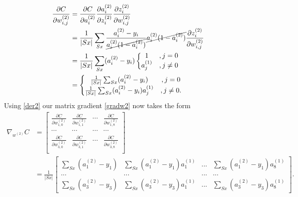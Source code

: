 \documentclass[a4paper,12pt,notitlepage]{article}
\begin{document}
\begin{equation} \label{der2}
\begin{split}
\frac{\partial C}{\partial w_{i,j}^{(2)}}&=\frac{\partial C}{\partial a_{i}^{(2)}}\frac{\partial a_{i}^{(2)}}{\partial z_{i}^{(2)}}\frac{\partial z_{i}^{(2)}}{\partial w_{i,j}^{(2)}}\\
&=\frac{1}{|Sx|}\sum_{Sx}\frac{a_{i}^{(2)}-y_{i}}{\cancel{a_{i}^{(2)}(1-a_{i}^{(2)})}}\cancel{a_{i}^{(2)}(1-a_{i}^{(2)})}\frac{\partial z_{i}^{(2)}}{\partial w_{i,j}^{(2)}}\\
&=\frac{1}{|Sx|}\sum_{Sx}(a_{i}^{(2)}-y_{i})\left\{\begin{matrix} 1&, j=0\\ a_{j}^{(1)}&, j\neq 0 \end{matrix}\right.\\
&=\left\{\begin{matrix} \frac{1}{|Sx|}\sum_{Sx}(a_{i}^{(2)}-y_{i})&, j=0\\ \frac{1}{|Sx|}\sum_{Sx}(a_{i}^{(2)}-y_{i})a_{j}^{(1)}&, j\neq 0. \end{matrix}\right.
\end{split}
\end{equation}
Using \eqref{der2} our matrix gradient \eqref{gradw2} now takes the form
\begin{equation} \label{gradw2f}
\begin{split}
\nabla_{w^{(2)}}C&=\begin{bmatrix}
 \frac{\partial C}{\partial w_{1,0}^{(2)}}& \frac{\partial C}{\partial w_{1,1}^{(2)}} &\cdots &\frac{\partial C}{\partial w_{1,8}^{(2)}}\\ 
 \cdots&\cdots&\cdots&\cdots \\
 \frac{\partial C}{\partial w_{3,0}^{(2)}}& \frac{\partial C}{\partial w_{3,1}^{(2)}} &\cdots &\frac{\partial C}{\partial w_{3,8}^{(2)}}\\ 
\end{bmatrix}\\ 
&=\frac{1}{|Sx|}\begin{bmatrix}
 \sum_{Sx}(a_{1}^{(2)}-y_{1}) &\sum_{Sx}(a_{1}^{(2)}-y_{1})a_{1}^{(1)}  &...  &\sum_{Sx}(a_{1}^{(2)}-y_{1})a_{8}^{(1)} \\ 
 ...&...  &... &... \\ 
 \sum_{Sx}(a_{3}^{(2)}-y_{3}) &\sum_{Sx}(a_{3}^{(2)}-y_{3})a_{1}^{(1)}  &...  &\sum_{Sx}(a_{3}^{(2)}-y_{3})a_{8}^{(1)}
\end{bmatrix}.
\end{split}
\end{equation}
\end{document}
